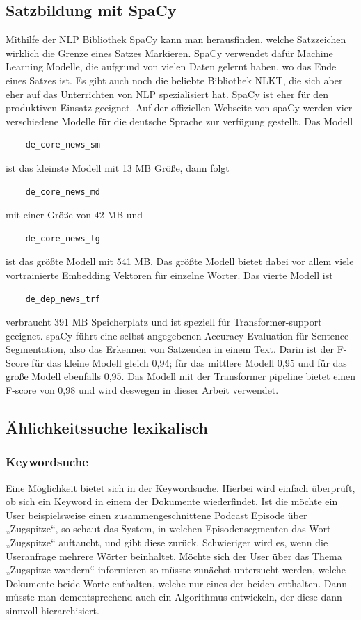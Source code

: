 \subsection{Satzbildung mit SpaCy}

Mithilfe der NLP Bibliothek SpaCy kann man herausfinden, welche Satzzeichen wirklich die Grenze eines Satzes Markieren.
SpaCy verwendet dafür Machine Learning Modelle, die aufgrund von vielen Daten gelernt haben, wo das Ende eines Satzes ist.
Es gibt auch noch die beliebte Bibliothek NLKT, die sich aber eher auf das Unterrichten von NLP spezialisiert hat.
SpaCy ist eher für den produktiven Einsatz geeignet.
Auf der offiziellen Webseite von spaCy werden vier verschiedene Modelle für die deutsche Sprache zur verfügung gestellt.
Das Modell 
\begin{verbatim}
    de_core_news_sm 
\end{verbatim} 
ist das kleinste Modell mit 13 MB Größe, dann folgt 
\begin{verbatim} 
    de_core_news_md 
\end{verbatim}
mit einer Größe von 42 MB und 
\begin{verbatim}
    de_core_news_lg 
\end{verbatim}
ist das größte Modell mit 541 MB.
Das größte Modell bietet dabei vor allem viele vortrainierte Embedding Vektoren für einzelne Wörter.
Das vierte Modell ist 
\begin{verbatim}
    de_dep_news_trf
\end{verbatim}
verbraucht 391 MB Speicherplatz und ist speziell für Transformer-support geeignet.
spaCy führt eine selbst angegebenen Accuracy Evaluation für Sentence Segmentation, also das Erkennen von Satzenden in einem Text.
Darin ist der F-Score für das kleine Modell gleich 0,94; für das mittlere Modell 0,95 und für das große Modell ebenfalls 0,95.
Das Modell mit der Transformer pipeline bietet einen F-score von 0,98 und wird deswegen in dieser Arbeit verwendet. \cite{spacy2024}


\subsection{Ählichkeitssuche lexikalisch}

\subsubsection{Keywordsuche}

Eine Möglichkeit bietet sich in der Keywordsuche. 
Hierbei wird einfach überprüft, ob sich ein Keyword in einem der Dokumente wiederfindet. Ist die möchte ein User beispielsweise einen zusammengeschnittene Podcast Episode über „Zugspitze“, so schaut das System, in welchen Episodensegmenten das Wort „Zugspitze“ auftaucht, und gibt diese zurück. 
Schwieriger wird es, wenn die Useranfrage mehrere Wörter beinhaltet. 
Möchte sich der User über das Thema „Zugspitze wandern“ informieren so müsste zunächst untersucht werden, welche Dokumente beide Worte enthalten, welche nur eines der beiden enthalten. 
Dann müsste man dementsprechend auch ein Algorithmus entwickeln, der diese dann sinnvoll hierarchisiert. 

